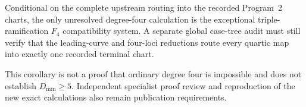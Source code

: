 \begin{corollary}
\label{cor:quartic-revised-frontier}
Conditional on the complete upstream routing into the recorded Program~2
charts, the only unresolved degree-four calculation is the exceptional
triple-ramification \(F_4\) compatibility system.  A separate global
case-tree audit must still verify that the leading-curve and four-loci
reductions route every quartic map into exactly one recorded terminal
chart.
\end{corollary}

This corollary is not a proof that ordinary degree four is impossible and
does not establish \(D_{\min}\ge5\).  Independent specialist proof review
and reproduction of the new exact calculations also remain publication
requirements.
